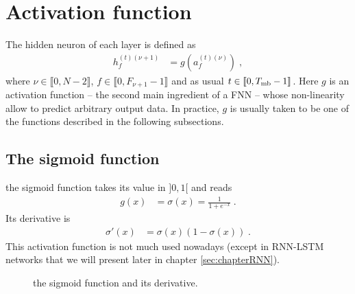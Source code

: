 \section{Activation function}

The hidden neuron of each layer is defined as
\begin{align}
h_{f}^{(t)(\nu+1)}&=g\left(a_{f}^{(t)(\nu)}\right)\;,
\end{align}
where $\nu\in\llbracket 0,N-2\rrbracket$, $f\in \llbracket 0,F_{\nu+1}-1\rrbracket$ and as usual $t \in \llbracket0,T_{{\rm mb}}-1\rrbracket$. Here $g$ is an activation function -- the second main ingredient of a FNN -- whose non-linearity allow to predict arbitrary output data. In practice, $g$ is usually taken to be one of the functions described in the following subsections. 


\subsection{The sigmoid function}

the sigmoid function takes its value in $]0,1[$ and reads
\begin{align}
g(x)&=\sigma(x)=\frac{1}{1+e^{-x}}\;.
\end{align}
Its derivative is
\begin{align}
\sigma'(x)&=\sigma(x)\left(1-\sigma(x)\right)\;.
\end{align}
This activation function is not much used nowadays (except in RNN-LSTM networks that we will present later in chapter \ref{sec:chapterRNN}).

\begin{figure}[H]
\begin{center}
\end{center}
\caption{\label{fig:sigmoid} the sigmoid function and its derivative.}
\end{figure}

